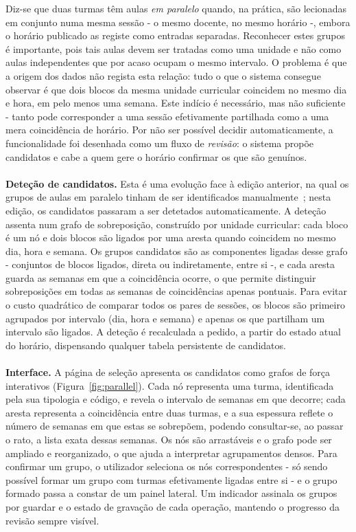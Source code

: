 \documentclass[10pt]{article}
\begin{document}
    Diz-se que duas turmas têm aulas \emph{em paralelo} quando, na prática, são lecionadas em conjunto numa mesma sessão - o mesmo docente, no mesmo horário -, embora o horário publicado as registe como entradas separadas. Reconhecer estes grupos é importante, pois tais aulas devem ser tratadas como uma unidade e não como aulas independentes que por acaso ocupam o mesmo intervalo. O problema é que a origem dos dados não regista esta relação: tudo o que o sistema consegue observar é que dois blocos da mesma unidade curricular coincidem no mesmo dia e hora, em pelo menos uma semana. Este indício é necessário, mas não suficiente - tanto pode corresponder a uma sessão efetivamente partilhada como a uma mera coincidência de horário. Por não ser possível decidir automaticamente, a funcionalidade foi desenhada como um fluxo de \emph{revisão}: o sistema propõe candidatos e cabe a quem gere o horário confirmar os que são genuínos.
    \\\\
    \textbf{Deteção de candidatos.} Esta é uma evolução face à edição anterior, na qual os grupos de aulas em paralelo tinham de ser identificados manualmente~\cite{oliveira2025}; nesta edição, os candidatos passaram a ser detetados automaticamente. A deteção assenta num grafo de sobreposição, construído por unidade curricular: cada bloco é um nó e dois blocos são ligados por uma aresta quando coincidem no mesmo dia, hora e semana. Os grupos candidatos são as componentes ligadas desse grafo - conjuntos de blocos ligados, direta ou indiretamente, entre si -, e cada aresta guarda as semanas em que a coincidência ocorre, o que permite distinguir sobreposições em todas as semanas de coincidências apenas pontuais. Para evitar o custo quadrático de comparar todos os pares de sessões, os blocos são primeiro agrupados por intervalo (dia, hora e semana) e apenas os que partilham um intervalo são ligados. A deteção é recalculada a pedido, a partir do estado atual do horário, dispensando qualquer tabela persistente de candidatos.
    \\\\
    \textbf{Interface.} A página de seleção apresenta os candidatos como grafos de força interativos (Figura~\ref{fig:parallel}). Cada nó representa uma turma, identificada pela sua tipologia e código, e revela o intervalo de semanas em que decorre; cada aresta representa a coincidência entre duas turmas, e a sua espessura reflete o número de semanas em que estas se sobrepõem, podendo consultar-se, ao passar o rato, a lista exata dessas semanas. Os nós são arrastáveis e o grafo pode ser ampliado e reorganizado, o que ajuda a interpretar agrupamentos densos. Para confirmar um grupo, o utilizador seleciona os nós correspondentes - só sendo possível formar um grupo com turmas efetivamente ligadas entre si - e o grupo formado passa a constar de um painel lateral. Um indicador assinala os grupos por guardar e o estado de gravação de cada operação, mantendo o progresso da revisão sempre visível.
\end{document}
